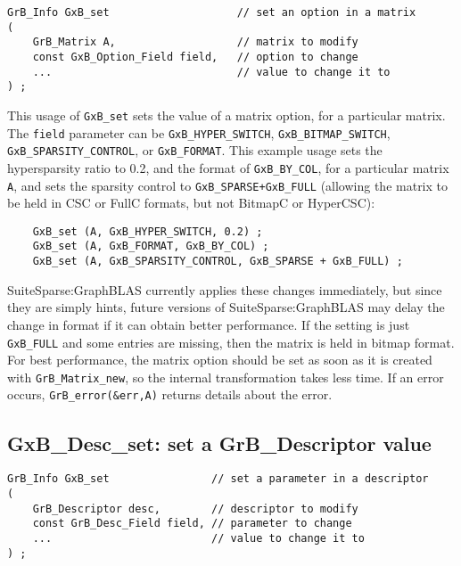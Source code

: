 \documentclass[12pt]{article}
\begin{document}
\begin{mdframed}[userdefinedwidth=6in]
{\footnotesize
\begin{verbatim}
GrB_Info GxB_set                    // set an option in a matrix
(
    GrB_Matrix A,                   // matrix to modify
    const GxB_Option_Field field,   // option to change
    ...                             // value to change it to
) ;
\end{verbatim} } \end{mdframed}

This usage of \verb'GxB_set' sets the value of a matrix option, for a
particular matrix.
The \verb'field' parameter can be
\verb'GxB_HYPER_SWITCH',
\verb'GxB_BITMAP_SWITCH',
\verb'GxB_SPARSITY_CONTROL', or
\verb'GxB_FORMAT'.
This example usage sets the hypersparsity ratio to 0.2, and the
format of \verb'GxB_BY_COL', for a particular matrix \verb'A', and sets the
sparsity control to \verb'GxB_SPARSE+GxB_FULL' (allowing the matrix to be held
in CSC or FullC formats, but not BitmapC or HyperCSC):

{\footnotesize
\begin{verbatim}
    GxB_set (A, GxB_HYPER_SWITCH, 0.2) ;
    GxB_set (A, GxB_FORMAT, GxB_BY_COL) ;
    GxB_set (A, GxB_SPARSITY_CONTROL, GxB_SPARSE + GxB_FULL) ;
\end{verbatim} }

SuiteSparse:GraphBLAS currently applies these changes immediately, but since
they are simply hints, future versions of SuiteSparse:GraphBLAS may delay the
change in format if it can obtain better performance.  If the setting is just
\verb'GxB_FULL' and some entries are missing, then the matrix is held in bitmap
format.  For best performance, the matrix option should be set as soon as it is
created with \verb'GrB_Matrix_new', so the internal transformation takes less
time.  If an error occurs, \verb'GrB_error(&err,A)' returns details about the
error.

\subsection{{\sf GxB\_Desc\_set:} set a {\sf GrB\_Descriptor} value}
\label{gxbset}

\begin{mdframed}[userdefinedwidth=6in]
{\footnotesize
\begin{verbatim}
GrB_Info GxB_set                // set a parameter in a descriptor
(
    GrB_Descriptor desc,        // descriptor to modify
    const GrB_Desc_Field field, // parameter to change
    ...                         // value to change it to
) ;
\end{verbatim} } \end{mdframed}
\end{document}

